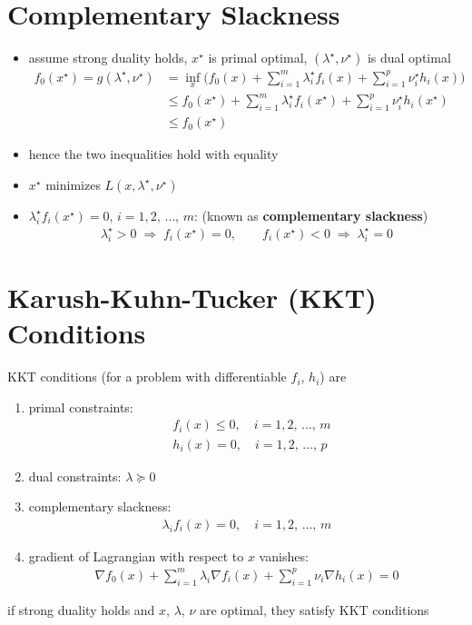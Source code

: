 \documentclass[11pt]{extarticle}
\newcommand{\ds}{\displaystyle}
\newcommand{\ie}{\;\Longrightarrow\;}
\theoremstyle{definition}
\begin{document}
\section*{Complementary Slackness}
\begin{itemize}
  \item assume strong duality holds, $\ds x^\star$ is primal optimal, $\ds(\lambda^\star,\nu^\star)$ is dual optimal
    \begin{align*}
      f_0(x^\star) = g(\lambda^\star, \nu^\star) &= \inf_{x}\bigg(f_0(x) + \sum_{i=1}^m\lambda_i^\star f_i(x) + \sum_{i=1}^p\nu_i^\star h_i(x)\bigg) \\
      &\leqslant f_0(x^\star) + \sum_{i=1}^m\lambda_i^\star f_i(x^\star) + \sum_{i=1}^p\nu_i^\star h_i(x^\star) \\
      &\leqslant f_0(x^\star)
    \end{align*}
  \item hence the two inequalities hold with equality
  \item $x^\star$ minimizes $L(x,\lambda^\star,\nu^\star)$
  \item $\ds\lambda_i^\star f_i(x^\star) = 0$, $\ds i = 1, 2,\,\ldots,\,m$: (known as {\bf complementary slackness})
    \begin{align*}
      \lambda_i^\star > 0\ie f_i(x^\star) = 0, \qquad f_i(x^\star) < 0\ie \lambda_i^\star = 0
    \end{align*}
\end{itemize}

\newpage

\section*{Karush-Kuhn-Tucker (KKT) Conditions}
KKT conditions (for a problem with differentiable $f_i$, $h_i$) are
\begin{enumerate}\setlength\itemsep{0em}
  \item primal constraints:
    \begin{align*}
      &f_i(x)\leqslant 0, \quad i = 1, 2,\,\ldots,\,m \\
      &h_i(x) = 0, \quad i = 1, 2,\,\ldots,\,p 
    \end{align*}
  \item dual constraints: $\ds\lambda\succcurlyeq 0$
  \item complementary slackness: 
    \begin{align*}
      \lambda_i f_i(x) = 0,\quad i = 1, 2,\,\ldots,\,m
    \end{align*}
  \item gradient of Lagrangian with respect to $x$ vanishes:
    \begin{align*}
      \nabla f_0(x) + \sum_{i = 1}^m \lambda_i\nabla f_i(x) + \sum_{i = 1}^p \nu_i\nabla h_i(x) = 0 
    \end{align*}
\end{enumerate}
if strong duality holds and $x$, $\lambda$, $\nu$ are optimal, they satisfy KKT conditions
\end{document}
